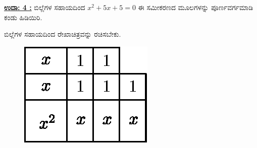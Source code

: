 \noindent
{\textbf{\underline{ಉದಾ: 4 :}}} ಬಿಲ್ಲೆಗಳ ಸಹಾಯದಿಂದ $x^2 + 5x + 5 = 0$ ಈ ಸಮೀಕರಣದ ಮೂಲಗಳನ್ನು ಪೂರ್ಣವರ್ಗಮಾಡಿ ಕಂಡು ಹಿಡಿಯಿರಿ. 

ಬಿಲ್ಲೆಗಳ ಸಹಾಯದಿಂದ ರೇಖಾಚಿತ್ರವನ್ನು ರಚಿಸಬೇಕು.
\begin{figure}[H]
\centering
\includegraphics[scale=0.8]{src/figure/chap3/fig3-50.eps}
\end{figure}

\eject

